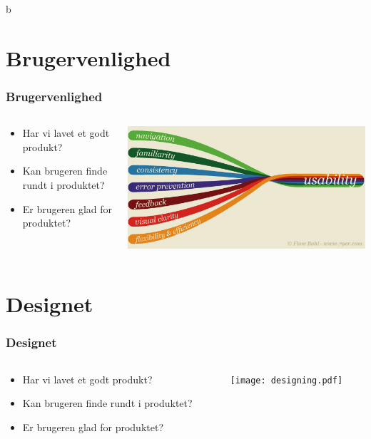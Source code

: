 b\documentclass{beamer}
\begin{document}
\section{Brugervenlighed}
\begin{frame}
  \frametitle{Brugervenlighed}
  \begin{columns}[T]
    \begin{column}{0.5\textwidth}
      \begin{itemize}
	    \item Har vi lavet et godt produkt?
	    \item Kan brugeren finde rundt i produktet?
	    \item Er brugeren glad for produktet?
      \end{itemize}  
    \end{column}
    \begin{column}{.5\textwidth}
      \includegraphics[width=\textwidth]{usability.jpg}
    \end{column}
  \end{columns}
\end{frame}


\section{Designet}
\begin{frame}
  \frametitle{Designet}
  \begin{columns}[T]
    \begin{column}{0.5\textwidth}
      \begin{itemize}
	    \item Har vi lavet et godt produkt?
	    \item Kan brugeren finde rundt i produktet?
	    \item Er brugeren glad for produktet?
      \end{itemize}  
    \end{column}
    \begin{column}{.5\textwidth}
      \texttt{[image: designing.pdf]}
    \end{column}
  \end{columns}
\end{frame}
\end{document}
